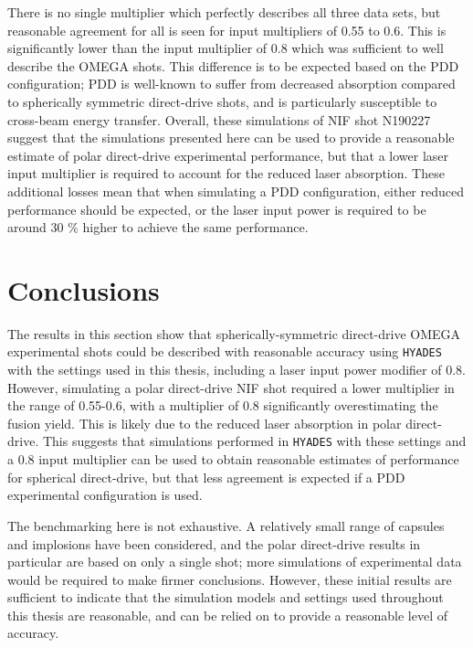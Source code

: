 There is no single multiplier which perfectly describes all three data sets, but reasonable agreement for all is seen for input multipliers of 0.55 to 0.6. This is significantly lower than the input multiplier of 0.8 which was sufficient to well describe the OMEGA shots. This difference is to be expected based on the PDD configuration; PDD is well-known to suffer from decreased absorption compared to spherically symmetric direct-drive shots, and is particularly susceptible to cross-beam energy transfer. Overall, these simulations of NIF shot N190227 suggest that the simulations presented here can be used to provide a reasonable estimate of polar direct-drive experimental performance, but that a lower laser input multiplier is required to account for the reduced laser absorption. These additional losses mean that when simulating a PDD configuration, either reduced performance should be expected, or the laser input power is required to be around 30 \% higher to achieve the same performance. 

\section{Conclusions}

The results in this section show that spherically-symmetric direct-drive OMEGA experimental shots could be described with reasonable accuracy using \texttt{HYADES} with the settings used in this thesis, including a laser input power modifier of 0.8. However, simulating a polar direct-drive NIF shot required a lower multiplier in the range of 0.55-0.6, with a multiplier of 0.8 significantly overestimating the fusion yield. This is likely due to the reduced laser absorption in polar direct-drive. This suggests that simulations performed in \texttt{HYADES} with these settings and a 0.8 input multiplier can be used to obtain reasonable estimates of performance for spherical direct-drive, but that less agreement is expected if a PDD experimental configuration is used.

The benchmarking here is not exhaustive. A relatively small range of capsules and implosions have been considered, and the polar direct-drive results in particular are based on only a single shot; more simulations of experimental data would be required to make firmer conclusions. However, these initial results are sufficient to indicate that the simulation models and settings used throughout this thesis are reasonable, and can be relied on to provide a reasonable level of accuracy.
